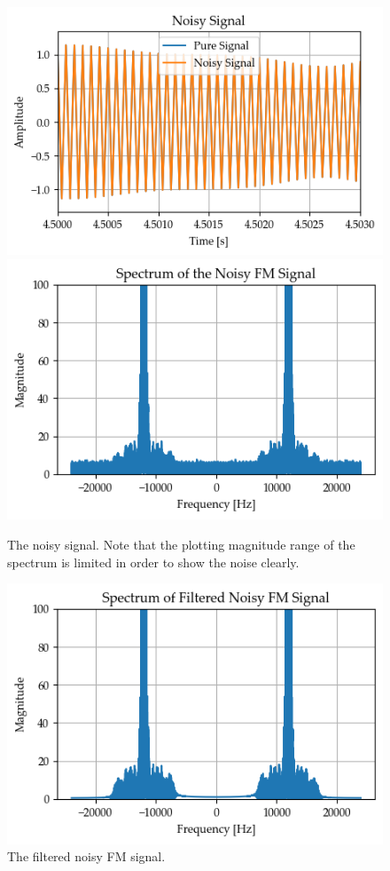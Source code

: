 \documentclass[../ECE459FinalProjectReport.tex]{subfiles}
\begin{document}
\begin{figure}[tb]
    \centering
    \includegraphics[width=0.49\linewidth]{plots/am/noisy_time.png}
    \includegraphics[width=0.49\linewidth]{plots/am/noisy_spectrum.png}
    \caption{The noisy signal. Note that the plotting magnitude range of the spectrum is limited in order to show the noise clearly.}
    \label{fig:noisy-am}
\end{figure}
\begin{figure}[tb]
    \centering
    \includegraphics[width=0.6\linewidth]{plots/am/noisy_spectrum_filtered.png}
    \caption{The filtered noisy FM signal.}
    \label{fig:noisy-am-filtered}
\end{figure}
\end{document}
